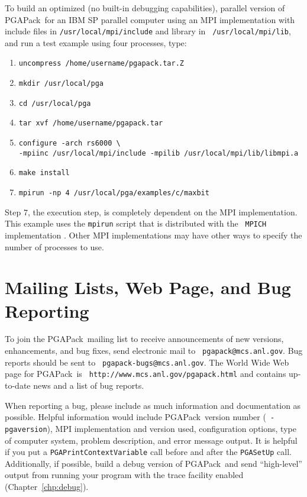\documentclass{report}
\newcommand{\pga}{PGAPack}
\begin{document}
To build an optimized (no built-in debugging capabilities), parallel
version of \pga\ for an IBM SP parallel computer using an MPI implementation
with include files in {\tt /usr/local/mpi/include} and library in {\tt
/usr/local/mpi/lib}, and run a test example using four processes, type:
\begin{enumerate}
\item {\tt uncompress /home/username/pgapack.tar.Z}
\item {\tt mkdir /usr/local/pga}
\item {\tt cd /usr/local/pga}
\item {\tt tar xvf /home/username/pgapack.tar}
\item {\tt configure -arch rs6000  \verb+\+} \\
\hspace{.5in}
{\tt -mpiinc /usr/local/mpi/include -mpilib /usr/local/mpi/lib/libmpi.a}
\item {\tt make install}
\item {\tt mpirun -np 4 /usr/local/pga/examples/c/maxbit}
\end{enumerate}

Step 7, the execution step, is completely dependent on the MPI implementation.
This example uses the {\tt mpirun} script that is distributed with the {\tt
MPICH} implementation \cite{mpich-web-page}.  Other MPI implementations may
have other ways to specify the number of processes to use.



\section{Mailing Lists, Web Page, and Bug Reporting}\label{sec:support}

To join the \pga\ mailing list to receive announcements of new versions,
enhancements, and bug fixes, send electronic mail to {\tt
pgapack@mcs.anl.gov}.  Bug reports should be sent to {\tt
pgapack-bugs@mcs.anl.gov}.  The World Wide Web page for \pga\ is {\tt
http://www.mcs.anl.gov/pgapack.html} and contains 
up-to-date news and a list of bug reports.


When reporting a bug, please include as much information and documentation as
possible.  Helpful information would include \pga\ version number ({\tt
-pgaversion}), MPI implementation and version used, configuration options,
type of computer system, problem description, and error message output.  It is
helpful if you put a {\tt PGAPrintContextVariable} call before and after the
{\tt PGASetUp} call.  Additionally, if possible, build a debug version of
\pga\ and send ``high-level'' output from running your program with the trace
facility enabled (Chapter~\ref{chp:debug}).
\end{document}
